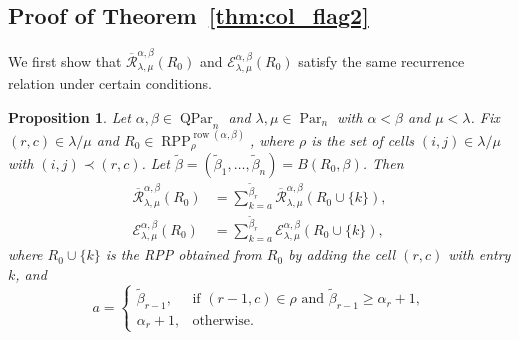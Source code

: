 \documentclass[12pt]{amsart}
\numberwithin{equation}{section}
\newtheorem{prop}[thm]{Proposition}
\theoremstyle{definition}
\newcommand\wb{\widetilde{\beta}}
\newcommand\row{\operatorname{row}}
\newcommand\Par{\operatorname{Par}}
\newcommand\QPar{\operatorname{QPar}}
\newcommand\RPP{\operatorname{RPP}}
\newcommand\lm{{\lambda/\mu}}
\newcommand\R{\mathcal{R}}
\newcommand\oR{\overline{\R}}
\newcommand\EE{\mathcal{E}}
\begin{document}
\subsection{Proof of Theorem~\ref{thm:col_flag2}}


We first show that $\oR^{\alpha,\beta}_{\lambda,\mu}(R_0)$ and
$\EE^{\alpha,\beta}_{\lambda,\mu}(R_0)$ satisfy the same recurrence relation 
under certain conditions.

\begin{prop}\label{prop:rec RPP R0}
  Let $\alpha,\beta\in\QPar_n$ and $\lambda,\mu\in\Par_n$ with $\alpha<\beta$ and
  $\mu<\lambda$. Fix $(r,c)\in\lm$ and $R_0\in
  \RPP^{\row(\alpha,\beta)}_{\rho}$, where $\rho$ is the set of cells
  $(i,j)\in\lm$ with $(i,j)\prec(r,c)$. Let
  $\wb=(\wb_1,\dots,\wb_n)=B(R_0,\beta)$. Then
  \begin{align}
    \label{eq:rec M}
    \oR^{\alpha,\beta}_{\lambda,\mu}(R_0) 
    &= \sum_{k=a}^{\wb_r} \oR^{\alpha,\beta}_{\lambda,\mu}(R_0\cup\{k\}),\\
    \label{eq:rec E}
    \EE^{\alpha,\beta}_{\lambda,\mu}(R_0)
    &= \sum_{k=a}^{\wb_r} \EE^{\alpha,\beta}_{\lambda,\mu}(R_0\cup\{k\}),
  \end{align}
  where $R_0\cup\{k\}$ is the RPP obtained from $R_0$ by adding the cell $(r,c)$
  with entry $k$, and 
  \[
a = \begin{cases}
  \wb_{r-1}, &\mbox{if $(r-1,c)\in\rho$ and $\wb_{r-1}\ge\alpha_r+1$},\\
 \alpha_r+1, &\mbox{otherwise}.
\end{cases}
\]
\end{prop}
\end{document}
